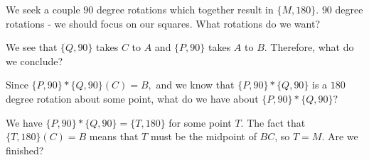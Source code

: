 
We seek a couple $90$ degree rotations which together result in $\{M,180\}.$ $90$ degree rotations - we should focus on our squares.  What rotations do we want?






We see that $\{Q,90\}$ takes $C$ to $A$ and $\{P,90\}$ takes $A$ to $ B.$  Therefore, what do we conclude?

Since $\{P,90\} * \{Q,90\} (C) = B,$ and we know that $\{P,90\} * \{Q,90\}$ is a $180$ degree rotation about some point, what do we have about $\{P, 90\} * \{Q,90\} ?$





We have $\{P, 90\} * \{Q,90\} = \{T,180\}$ for some point $T.$  The fact that $\{T,180\} (C) = B$ means that $T$ must be the midpoint of $BC$, so $T = M.$  Are we finished?


